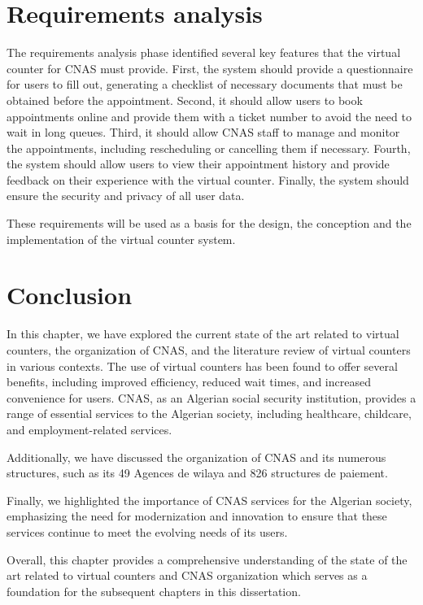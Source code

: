 \section{Requirements analysis}
The requirements analysis phase identified several key features that the virtual counter for CNAS must provide. First, the system should provide a questionnaire for users to fill out, generating a checklist of necessary documents that must be obtained before the appointment. Second, it should allow users to book appointments online and provide them with a ticket number to avoid the need to wait in long queues. Third, it should allow CNAS staff to manage and monitor the appointments, including rescheduling or cancelling them if necessary. Fourth, the system should allow users to view their appointment history and provide feedback on their experience with the virtual counter. Finally, the system should ensure the security and privacy of all user data. 
\medskip 

These requirements will be used as a basis for the design, the conception and the implementation of the virtual counter system.
\newpage
\section{Conclusion}
In this chapter, we have explored the current state of the art related to virtual counters, the organization of CNAS, and the literature review of virtual counters in various contexts. The use of virtual counters has been found to offer several benefits, including improved efficiency, reduced wait times, and increased convenience for users. CNAS, as an Algerian social security institution, provides a range of essential services to the Algerian society, including healthcare, childcare, and employment-related services.

Additionally, we have discussed the organization of CNAS and its numerous structures, such as its 49 Agences de wilaya and 826 structures de paiement. 
\medskip

Finally, we highlighted the importance of CNAS services for the Algerian society, emphasizing the need for modernization and innovation to ensure that these services continue to meet the evolving needs of its users.

Overall, this chapter provides a comprehensive understanding of the state of the art related to virtual counters and CNAS organization which serves as a foundation for the subsequent chapters in this dissertation.

